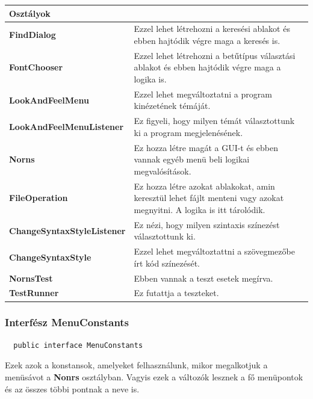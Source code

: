 \documentclass[12pt]{article}
\begin{document}
\begin{longtable}{|p{5cm}|p{10cm}|} \hline
    \multicolumn{2}{|p{15cm}|}{\textbf{Osztályok}}  \\ \hline
    \textbf{FindDialog} & Ezzel lehet létrehozni a keresési ablakot és ebben
    hajtódik végre maga a keresés is.  \\ \hline
    \textbf{FontChooser} & Ezzel lehet létrehozni a betűtípus választási ablakot
    és ebben hajtódik végre maga a logika is. \\ \hline
    \textbf{LookAndFeelMenu} & Ezzel lehet megváltoztatni a program kinézetének
    témáját. \\ \hline
    \textbf{LookAndFeelMenuListener} & Ez figyeli, hogy milyen témát választottunk
    ki a program megjelenésének. \\ \hline
    \textbf{Norns} & Ez hozza létre magát a GUI-t és ebben vannak egyéb menü beli
    logikai megvalósítások. \\ \hline
    \textbf{FileOperation} & Ez hozza létre azokat ablakokat, amin keresztül lehet
    fájlt menteni vagy azokat megnyitni. A logika is itt tárolódik. \\ \hline
    \textbf{ChangeSyntaxStyleListener} & Ez nézi, hogy milyen szintaxis színezést
    választottunk ki. \\ \hline
    \textbf{ChangeSyntaxStyle} & Ezzel lehet megváltoztattni a szövegmezőbe írt
    kód színezését. \\ \hline
    \textbf{NornsTest} & Ebben vannak a teszt esetek megírva. \\ \hline
    \textbf{TestRunner} & Ez futattja a teszteket. \\ \hline
\end{longtable}

\subsubsection*{Interfész MenuConstants}
\begin{lstlisting}
  public interface MenuConstants
\end{lstlisting}

Ezek azok a konstansok, amelyeket felhasználunk, mikor megalkotjuk a menüsávot
a \textbf{Nonrs} osztályban. Vagyis ezek a változók lesznek a fő menüpontok és az
összes többi pontnak a neve is.
\end{document}

